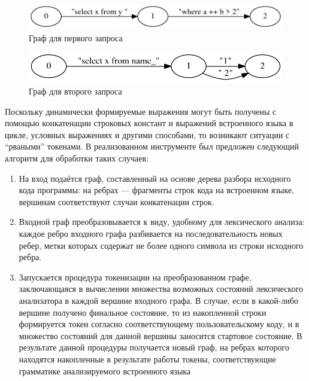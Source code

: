 \begin{figure}[t]
\centering
\includegraphics[width=\textwidth]{Polubelova/Graph1}
\caption{Граф для первого запроса}
\label{fig:Graph1} 
\end{figure}

\begin{figure}[t]
\centering
\includegraphics[width=\textwidth]{Polubelova/Graph2}
\caption{Граф для второго запроса}
\label{fig:Graph2} 
\end{figure}

Поскольку динамически формируемые выражения могут быть получены с помощью конкатенации строковых констант и выражений встроенного языка в цикле, 
условных выражениях и другими способами, то возникают ситуации с “рваными” токенами. В реализованном инструменте был предложен следующий алгоритм 
для обработки таких случаев:

\begin{enumerate}
\item	На вход подаётся граф, составленный на основе дерева разбора исходного кода программы: на ребрах — фрагменты строк кода на встроенном языке, 
вершинам соответствуют случаи конкатенации строк.
\item	Входной граф преобразовывается к виду, удобному для лексического анализа: каждое ребро входного графа разбивается на последовательность новых 
ребер, метки которых содержат не более одного символа из строки исходного ребра.
\item   Запускается процедура токенизации на преобразованном графе, заключающаяся в вычислении множества возможных состояний лексического анализатора
в каждой вершине входного графа. В случае, если в какой-либо вершине получено финальное состояние, то из накопленной строки формируется токен согласно 
соответствующему пользовательскому коду, и в множество состояний для данной вершины заносится стартовое состояние. В результате данной процедуры получается
новый граф, на ребрах которого находятся накопленные в результате работы токены, соответствующие грамматике анализируемого встроенного языка
\end{enumerate}

